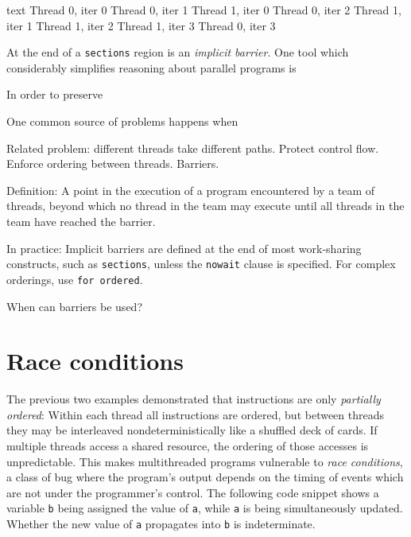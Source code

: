 \documentclass[conference, a4paper]{IEEEtran-modified}
\begin{document}
      \begin{ccode}[]
        {text}
        Thread 0, iter 0
        Thread 0, iter 1
          Thread 1, iter 0
        Thread 0, iter 2
          Thread 1, iter 1
          Thread 1, iter 2
          Thread 1, iter 3
        Thread 0, iter 3\end{ccode}


At the end of a \texttt{sections} region is an \emph{implicit barrier}.
One tool which considerably simplifies reasoning about parallel programs is 

    In order to preserve 


  One common source of problems happens when 

  Related problem: different threads take different paths.
  Protect control flow. Enforce ordering between threads. Barriers.

  Definition: A point in the execution of a program encountered by a team of threads, beyond which no thread in the team may execute until all threads in the team have reached the barrier.
 
  In practice: Implicit barriers are defined at the end of most work-sharing constructs, such as \texttt{sections}, unless the \texttt{nowait} clause is specified. For complex orderings, use \texttt{for ordered}.

  When can barriers be used?

  


\section{Race conditions}

The previous two examples demonstrated that instructions are only \emph{partially ordered}: Within each thread all instructions are ordered, but between threads they may be interleaved nondeterministically like a shuffled deck of cards. If multiple threads access a shared resource, the ordering of those accesses is unpredictable. This makes multithreaded programs vulnerable to \emph{race conditions}, a class of bug where the program's output depends on the timing of events which are not under the programmer's control. The following code snippet shows a variable \texttt{b} being assigned the value of \texttt{a}, while \texttt{a} is being simultaneously updated. Whether the new value of \texttt{a} propagates into \texttt{b} is indeterminate.
\end{document}
